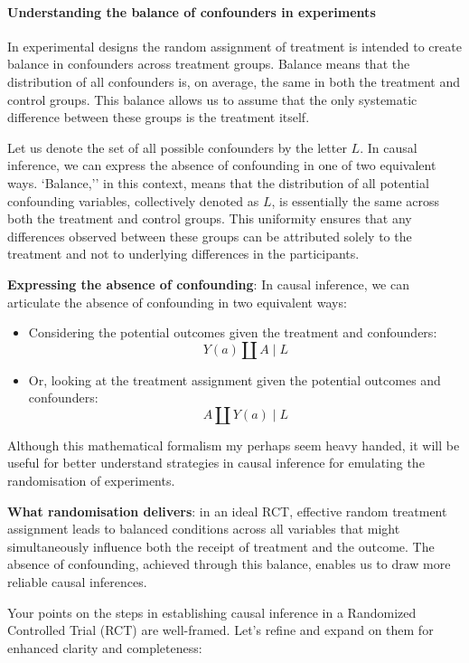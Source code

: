 \documentclass[
  singlecolumn]{article}
\let\oldparagraph\paragraph
\renewcommand{\paragraph}[1]{\oldparagraph{#1}\mbox{}}
\begin{document}
\paragraph{Understanding the balance of confounders in
experiments}\label{understanding-the-balance-of-confounders-in-experiments}

In experimental designs the random assignment of treatment is intended
to create balance in confounders across treatment groups. Balance means
that the distribution of all confounders is, on average, the same in
both the treatment and control groups. This balance allows us to assume
that the only systematic difference between these groups is the
treatment itself.

Let us denote the set of all possible confounders by the letter \(L\).
In causal inference, we can express the absence of confounding in one of
two equivalent ways. `Balance,'' in this context, means that the
distribution of all potential confounding variables, collectively
denoted as \(L\), is essentially the same across both the treatment and
control groups. This uniformity ensures that any differences observed
between these groups can be attributed solely to the treatment and not
to underlying differences in the participants.

\textbf{Expressing the absence of confounding}: In causal inference, we
can articulate the absence of confounding in two equivalent ways:

\begin{itemize}
\item
  Considering the potential outcomes given the treatment and
  confounders: \[
     Y(a) \coprod A \mid L
     \]
\item
  Or, looking at the treatment assignment given the potential outcomes
  and confounders: \[
     A \coprod Y(a) \mid L
     \]
\end{itemize}

Although this mathematical formalism my perhaps seem heavy handed, it
will be useful for better understand strategies in causal inference for
emulating the randomisation of experiments.

\textbf{What randomisation delivers}: in an ideal RCT, effective random
treatment assignment leads to balanced conditions across all variables
that might simultaneously influence both the receipt of treatment and
the outcome. The absence of confounding, achieved through this balance,
enables us to draw more reliable causal inferences.

Your points on the steps in establishing causal inference in a
Randomized Controlled Trial (RCT) are well-framed. Let's refine and
expand on them for enhanced clarity and completeness:
\end{document}
